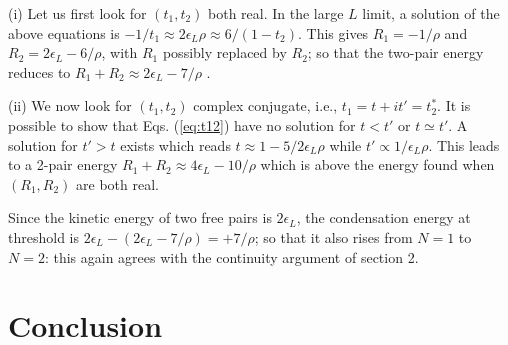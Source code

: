 \documentclass[5p,twocolumn]{elsarticle}
\begin{document}
(i) Let us first look for $(t_1,t_2)$ both real. In the large $L$ limit, a solution of the above equations is $-1/t_1\approx 2 \epsilon_L\rho \approx 6/(1-t_2)$. This gives $R_1=-1/\rho$ and $R_2=2 \epsilon_L-6/\rho$, with $R_1$ possibly replaced by  $R_2$; so that the two-pair energy reduces to $R_1+R_2\approx2 \epsilon_L-7/\rho$ .

(ii) We now look for $(t_1,t_2)$ complex conjugate, i.e., $t_1=t+it'=t^*_2$. It is possible to show that Eqs. (\ref{eq:t12}) have no solution for $t<t'$ or $t\simeq t'$. A solution for $t'>t$ exists which reads $t\approx1-5/2\epsilon_L\rho$ while $t'\propto1/\epsilon_L\rho$. This leads to a 2-pair energy $R_1+R_2\approx4 \epsilon_L-10/\rho$ which is above the energy found when $(R_1,R_2)$ are both real.

Since the kinetic energy of two free pairs is $2\epsilon_L$, the condensation energy at threshold is 
$ 2\epsilon_L-(2 \epsilon_L-7/\rho)=+7/\rho$; so that it also rises from $N=1$ to $N=2$: this again agrees with the continuity argument of section 2.

 

\section{Conclusion\label{sec:conclusion}}



\end{document}

